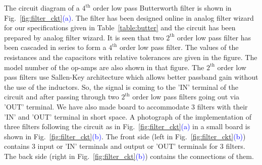 The circuit diagram of a  $\mathrm{4^{th}}$ order low pass Butterworth filter is shown in Fig.~\ref{fig:filter_ckt}\textcolor{blue}{(a)}. The filter has been designed online in analog filter wizard \cite{fWizard} for our specifications given in Table~\ref{table:butter} and the circuit has been prepared by analog filter wizard. It is seen that two $\mathrm{2^{th}}$ order low pass filter has been cascaded in series to form a $\mathrm{4^{th}}$ order low pass filter. The values of the resistances and the capacitors with relative tolerances are given in the figure. The model number of the op-amps are also shown in that figure. The $\mathrm{2^{th}}$ order low pass filters use Sallen-Key architecture which allows better passband gain without the use of the inductors. So, the signal is coming to the 'IN' terminal of the circuit and after passing through two $\mathrm{2^{th}}$ order low pass filters going out via 'OUT' terminal. We have also made board to accommodate 3 filters with their 'IN' and 'OUT' terminal in short space. A photograph of the implementation of three filters following the circuit as in Fig.~\ref{fig:filter_ckt}\textcolor{blue}{(a)} in a small board is shown in Fig.~\ref{fig:filter_ckt}\textcolor{blue}{(b)}. The front side (left in Fig.~\ref{fig:filter_ckt}\textcolor{blue}{(b)}) contains 3 input or 'IN' terminals and output or 'OUT' terminals for 3 filters. The back side (right in Fig.~\ref{fig:filter_ckt}\textcolor{blue}{(b)}) contains the connections of them.



